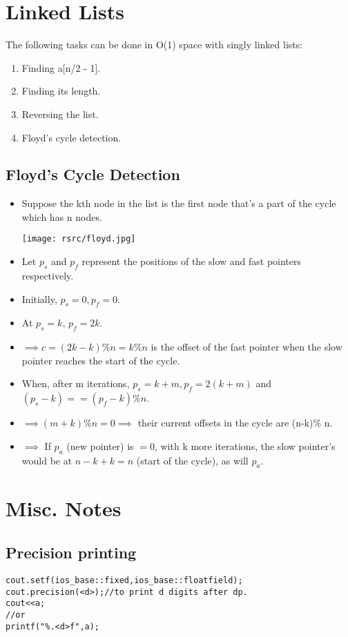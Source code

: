 \documentclass{article}
\begin{document}
\section{Linked Lists}
The following tasks can be done in O(1) space with singly linked lists:
\begin{enumerate}
    \item Finding a[n/2 - 1].
    \item Finding its length.
    \item Reversing the list.
    \item Floyd's cycle detection.
\end{enumerate}
\subsection{Floyd's Cycle Detection}
\begin{itemize}
\item Suppose the kth node in the list is the first node that's a part of the cycle which has n nodes.
\begin{center}
\texttt{[image: rsrc/floyd.jpg]}
\end{center}
\item Let $p_s$ and $p_f$ represent the positions of the slow and fast pointers respectively.
\item Initially, $p_s = 0, p_f = 0.$
\item At $p_s = k$, $p_f = 2k$.
\item $\implies c = (2k-k) \% n = k \% n$ is the offset of the fast pointer when the slow pointer reaches the start of the cycle.
\item When, after m iterations, $p_s = k+m, p_f = 2(k+m)$ and $(p_s-k) == (p_f-k) \% n$.
\item $\implies (m + k) \% n = 0 \implies $ their current offsets in the cycle are (n-k)\% n.
\item $\implies $ If $p_a$ (new pointer) is $=0$, with k more iterations, the slow pointer's would be at $n-k + k = n$ (start of the cycle), as will $p_a$.
\end{itemize}
\section*{Misc. Notes}
\subsection*{Precision printing}
\begin{lstlisting}
cout.setf(ios_base::fixed,ios_base::floatfield);
cout.precision(<d>);//to print d digits after dp.
cout<<a;
//or
printf("%.<d>f",a);
\end{lstlisting}
\end{document}
